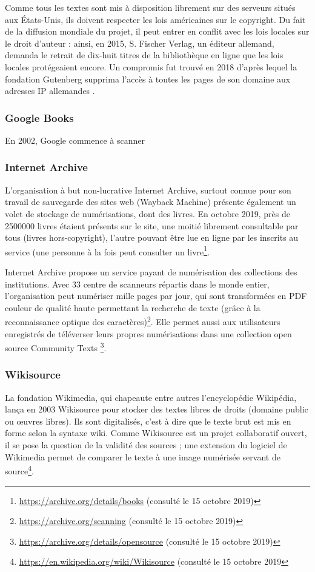 Comme tous les textes sont mis à disposition librement sur des serveurs situés aux États-Unis, ils doivent respecter les lois américaines sur le copyright.
Du fait de la diffusion mondiale du projet, il peut entrer en conflit avec les lois locales sur le droit d'auteur : ainsi, en 2015, S. Fischer Verlag, un éditeur allemand, demanda le retrait de dix-huit titres de la bibliothèque en ligne que les lois locales protégeaient encore.
Un compromis fut trouvé en 2018 d'après lequel la fondation Gutenberg supprima l'accès à toutes les pages de son domaine aux adresses IP allemandes \parencite{noauthor_court_2018}.
\subsubsection{Google Books}
En 2002, Google commence à scanner 
\subsubsection{Internet Archive}
L'organisation à but non-lucrative Internet Archive, surtout connue pour son travail de sauvegarde des sites web (Wayback Machine) présente également un volet de stockage de numérisations, dont des livres.
En octobre 2019, près de 2500000 livres étaient présents sur le site, une moitié librement consultable par tous (livres hors-copyright), l'autre pouvant être lue en ligne par les inscrits au service (une personne à la fois peut consulter un livre\footnote{\url{https://archive.org/details/books} (consulté le 15 octobre 2019)}.

Internet Archive propose un service payant de numérisation des collections des institutions.
Avec 33 centre de scanneurs répartis dans le monde entier, l'organisation peut numériser mille pages par jour, qui sont transformées en PDF couleur de qualité haute permettant la recherche de texte (grâce à la reconnaissance optique des caractères)\footnote{\url{https://archive.org/scanning} (consulté le 15 octobre 2019)}.
Elle permet aussi aux utilisateurs enregistrés de téléverser leurs propres numérisations dans une collection open source \og Community Texts \fg\footnote{\url{https://archive.org/details/opensource} (consulté le 15 octobre 2019)}.
\subsubsection{Wikisource}
La fondation Wikimedia, qui chapeaute entre autres l'encyclopédie Wikipédia, lança en 2003 Wikisource pour stocker des textes libres de droits (domaine public ou œuvres libres).
Ils sont digitalisés, c'est à dire que le texte brut est mis en forme selon la syntaxe wiki.
Comme Wikisource est un projet collaboratif ouvert, il se pose la question de la validité des sources ; une extension du logiciel de Wikimedia permet de comparer le texte à une image numérisée servant de source\footnote{\url{https://en.wikipedia.org/wiki/Wikisource} (consulté le 15 octobre 2019}.
